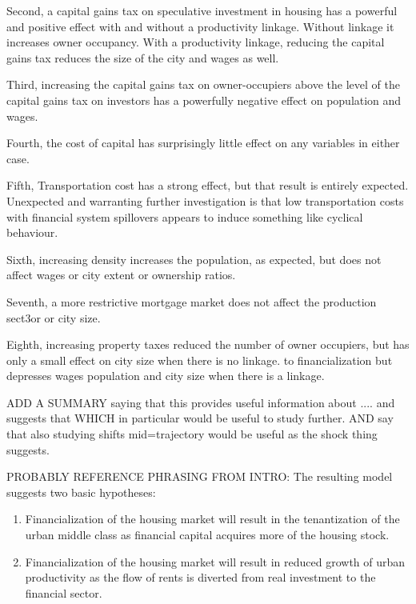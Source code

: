 Second, a capital gains tax on speculative investment in housing has a powerful and positive effect with and without a productivity linkage. Without linkage it increases owner occupancy. With a productivity linkage, reducing the capital gains tax reduces the size of the city and wages as well. 

Third, increasing the capital gains tax on owner-occupiers above the level of the capital gains tax on investors has a powerfully negative effect on population and wages.

Fourth, the cost of capital has surprisingly little effect on any variables in either case.

Fifth, Transportation cost has a strong effect, but that result is entirely expected. Unexpected and warranting further investigation is that low transportation costs with financial system spillovers appears to induce something like cyclical behaviour.

Sixth, increasing density increases the population, as expected, but does not affect wages or city extent 
{\color{red} or ownership ratios.}

Seventh, a more restrictive mortgage market does not affect the production sect3or or city size.

Eighth, increasing property taxes reduced the number of owner occupiers, but has only a small effect on city size when there is no linkage. to financialization but depresses wages population and city size when there is a linkage. 


{\color{red} ADD A SUMMARY saying that this provides useful information about .... and suggests that WHICH in particular would be useful to study further. AND say that also studying shifts mid=trajectory would be useful as the shock thing suggests.

PROBABLY REFERENCE PHRASING FROM INTRO: 
The resulting model suggests two basic hypotheses:
\begin{enumerate}
    \item Financialization of the housing market will result in the tenantization of the urban middle class as financial capital acquires more of the housing stock. %
    \item Financialization of the housing market will result in reduced growth of urban productivity as the flow of rents is diverted from real investment to the financial sector.
\end{enumerate} }



